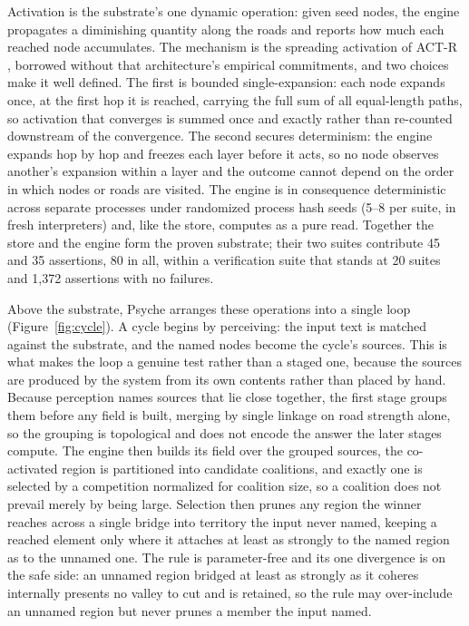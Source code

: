 \documentclass[conference]{IEEEtran}
\begin{document}
Activation is the substrate's one dynamic operation: given seed nodes, the engine
propagates a diminishing quantity along the roads and reports how much each reached node
accumulates. The mechanism is the spreading activation of ACT-R \cite{anderson1998atomic},
borrowed without that architecture's empirical commitments, and two choices make it well
defined. The first is bounded single-expansion: each node expands once, at the first hop it
is reached, carrying the full sum of all equal-length paths, so activation that converges is
summed once and exactly rather than re-counted downstream of the convergence. The second
secures determinism: the engine expands hop by hop and freezes each layer before it acts, so
no node observes another's expansion within a layer and the outcome cannot depend on the
order in which nodes or roads are visited. The engine is in consequence deterministic across
separate processes under randomized process hash seeds (5--8 per suite, in fresh
interpreters) and, like the store, computes as a pure read. Together the store and the engine
form the proven substrate; their two suites contribute 45 and 35 assertions, 80 in all,
within a verification suite that stands at 20 suites and 1{,}372 assertions with no failures.

Above the substrate, Psyche arranges these operations into a single loop
(Figure~\ref{fig:cycle}). A cycle begins by perceiving: the input text is matched against
the substrate, and the named nodes become the cycle's sources. This is what makes the loop
a genuine test rather than a staged one, because the sources are produced by the system from
its own contents rather than placed by hand. Because perception names sources that lie close
together, the first stage groups them before any field is built, merging by single linkage
\cite{sibson1973slink} on road strength alone, so the grouping is topological and does not
encode the answer the later stages compute. The engine then builds its field over the
grouped sources, the co-activated region is partitioned into candidate coalitions, and
exactly one is selected by a competition normalized for coalition size, so a coalition does
not prevail merely by being large. Selection then prunes any region the winner reaches across
a single bridge into territory the input never named, keeping a reached element only where it
attaches at least as strongly to the named region as to the unnamed one. The rule is
parameter-free and its one divergence is on the safe side: an unnamed region bridged at least
as strongly as it coheres internally presents no valley to cut and is retained, so the rule
may over-include an unnamed region but never prunes a member the input named.
\end{document}
